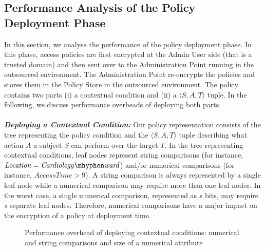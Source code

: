 \documentclass[epsfig,a4paper,11pt,titlepage]{book}
\numberwithin{algorithm}{chapter}
\begin{document}
\subsection{Performance Analysis of the Policy Deployment Phase}
\label{sec:espoon-policy-deployment}

In this section, we analyse the performance of the policy deployment phase. In this phase, access policies are first encrypted at the Admin User side (that is a trusted domain) and then sent over to the Administration Point running in the outsourced environment. The Administration Point re-encrypts the policies and stores them in the Policy Store in the outsourced environment. The policy contains two parts (i) a contextual condition and (ii) a $\langle S, A, T \rangle$ tuple. In the following, we discuss performance overheads of deploying both parts. \\ \\
\noindent \emph{\textbf{Deploying a Contextual Condition:}}
Our policy representation consists of the tree representing the policy condition and the $\langle S, A, T \rangle$ tuple describing what action $A$ a subject $S$ can perform over the target $T$. In the tree representing contextual conditions, leaf nodes represent string comparisons (for instance, $\mathit{Location = Cardiology \mhyphen ward}$) and/or numerical comparisons (for instance, $\mathit{Access Time > 9}$). A string comparison is always represented by a single leaf node while a numerical comparison may require more than one leaf nodes. In the worst case, a single numerical comparison, represented as $s$ bits, may require $s$ separate leaf nodes. Therefore, numerical comparisons have a major impact on the encryption of a policy at deployment time.

\begin{figure} [htp]
\centering
{}
\caption[Performance overhead of deploying contextual conditions]{Performance overhead of deploying contextual conditions:  numerical and string comparisons and  size of a numerical attribute}
\label{fig:erbac-policy-deployment-context}
\end{figure}
\end{document}
